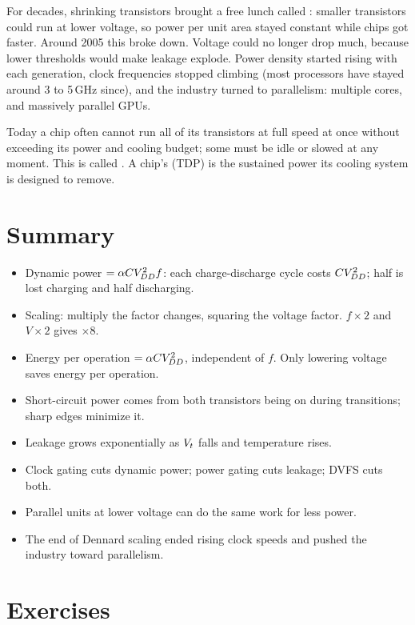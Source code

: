 For decades, shrinking transistors brought a free lunch called : smaller transistors could run at lower voltage, so power per unit area stayed constant while chips got faster. Around 2005 this broke down. Voltage could no longer drop much, because lower thresholds would make leakage explode. Power density started rising with each generation, clock frequencies stopped climbing (most processors have stayed around 3 to 5\,GHz since), and the industry turned to parallelism: multiple cores, and massively parallel GPUs.

Today a chip often cannot run all of its transistors at full speed at once without exceeding its power and cooling budget; some must be idle or slowed at any moment. This is called . A chip's  (TDP) is the sustained power its cooling system is designed to remove.

\section{Summary}

\begin{itemize}
  \item Dynamic power $= \alpha C V_{DD}^2 f$: each charge-discharge cycle costs $CV_{DD}^2$; half is lost charging and half discharging.
  \item Scaling: multiply the factor changes, squaring the voltage factor. $f\times2$ and $V\times2$ gives $\times8$.
  \item Energy per operation $= \alpha C V_{DD}^2$, independent of $f$. Only lowering voltage saves energy per operation.
  \item Short-circuit power comes from both transistors being on during transitions; sharp edges minimize it.
  \item Leakage grows exponentially as $V_{t}$ falls and temperature rises.
  \item Clock gating cuts dynamic power; power gating cuts leakage; DVFS cuts both.
  \item Parallel units at lower voltage can do the same work for less power.
  \item The end of Dennard scaling ended rising clock speeds and pushed the industry toward parallelism.
\end{itemize}

\section{Exercises}

